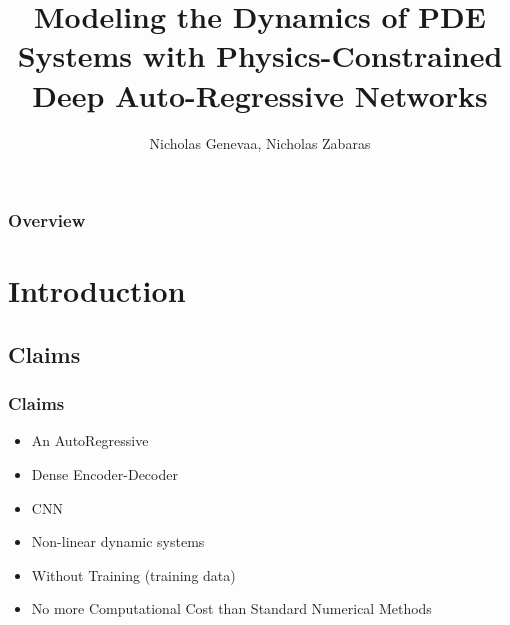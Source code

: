 \documentclass{beamer}
\title[CVRG SUMMER 2021 PDE with NNs]{Modeling the Dynamics of PDE Systems with
Physics-Constrained Deep Auto-Regressive Networks} %
\author{Nicholas Genevaa, Nicholas Zabaras} %
\institute[UND] %
{
University of Notre Dame\\ %
\medskip
\textit{ngeneva@nd.edu} %
\textit{nzabaras@nd.edu}
}
\theoremstyle{remark}
\begin{document}
\begin{frame}
\titlepage %
\end{frame}

\begin{frame}
\frametitle{Overview} %
\tableofcontents %
\end{frame}


\section{Introduction} %

\subsection{Claims} %
\begin{frame}
\frametitle{Claims}
\begin{itemize}
\item An AutoRegressive
\item Dense Encoder-Decoder
\item CNN
\item Non-linear dynamic systems
\item Without Training (training data)
\item No more Computational Cost than Standard Numerical Methods

\end{itemize}
\end{frame}
\end{document}
